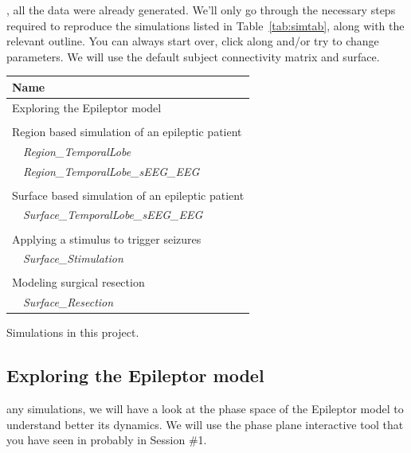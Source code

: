 \documentclass{tufte-handout}
\begin{document}
, 
all the data were already generated. We'll only go through the necessary steps
required to reproduce the simulations listed in Table~\ref{tab:simtab}, along
with the relevant outline. You can always start over, click along and/or try
to change parameters. We will use the default subject connectivity matrix and
surface.


\begin{margintable}
  \centering
  \selectfont
  \begin{tabular}{l}
    \toprule
    Name \\
    \midrule
    Exploring the Epileptor model\\
    \\
    Region based simulation of an epileptic patient \\
    $\quad$\textit{Region\_TemporalLobe} \\
    $\quad$\textit{Region\_TemporalLobe\_sEEG\_EEG}  \\
    \\
    Surface based simulation of an epileptic patient \\
    $\quad$\textit{Surface\_TemporalLobe\_sEEG\_EEG}  \\
    \\
    Applying a stimulus to trigger seizures \\
    $\quad$\textit{Surface\_Stimulation}  \\ 
    \\
    Modeling surgical resection\\
    $\quad$\textit{Surface\_Resection} \\
    \bottomrule
  \end{tabular}
  \caption{Simulations in this project.}
  \label{tab:simtab}
\end{margintable}


\subsection{Exploring the Epileptor model}\label{sec:epileptor}


any simulations, we will have a look at the phase space of the Epileptor model
to understand better its dynamics. We will use the phase plane interactive tool that you
have seen in probably in Session \#1.
\end{document}
